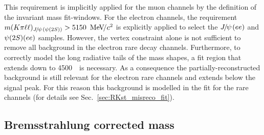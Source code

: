 This requirement is implicitly applied for the muon channels by the definition of the invariant mass fit-windows. For the electron channels,
the requirement $m(K\pi\ell\ell)_{\jpsi(\psitwos)} > 5150~\mevcc$ is explicitly applied to select the $\jpsi(ee)$ and $\psitwos(ee)$ samples.
However, the vertex constraint alone is not sufficient to remove all background in the electron rare decay channels.
Furthermore, to correctly model the long radiative tails of the mass shapes, a fit region that extends 
down to 4500~\mevcc~is necessary. As a consequence the partially-reconstructed background is still relevant
for the electron rare channels and extends below the signal peak. For this reason this background is modelled 
in the fit for the rare channels (for details see Sec.~\ref{sec:RKst_misreco_fit}).


%


\subsection{Bremsstrahlung corrected mass}
\label{sec:HOP}

